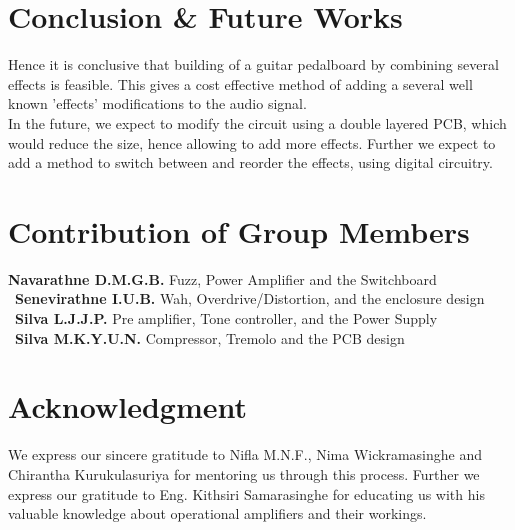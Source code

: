 \documentclass{article}
\begin{document}
	
	\section{Conclusion \& Future Works}
            Hence it is conclusive that building of a guitar pedalboard by combining several effects is feasible. This gives a cost effective method of adding a several well known 'effects' modifications to the audio signal.\\

            In the future, we expect to modify the circuit using a double layered PCB, which would reduce the size, hence allowing to add more effects. Further we expect to add a method to switch between and reorder the effects, using digital circuitry.
	
	\section{Contribution of Group Members}
            \textbf{Navarathne D.M.G.B.} Fuzz, Power Amplifier and the Switchboard\\\
            \textbf{Senevirathne I.U.B.} Wah, Overdrive/Distortion, and the enclosure design\\\
            \textbf{Silva L.J.J.P.} Pre amplifier, Tone controller, and the Power Supply\\\
            \textbf{Silva M.K.Y.U.N.} Compressor, Tremolo and the PCB design
	
	\section*{Acknowledgment}
            We express our sincere gratitude to Nifla M.N.F., Nima Wickramasinghe and Chirantha Kurukulasuriya for mentoring us through this process. Further we express our gratitude to Eng. Kithsiri Samarasinghe for educating us with his valuable knowledge about operational amplifiers and their workings. 
\end{document}
